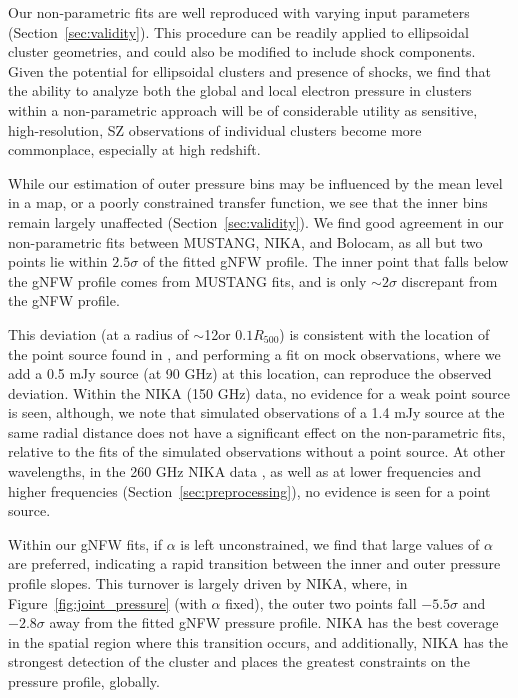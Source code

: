 \documentclass[twocolumn,traditabstract]{aa}
\begin{document}
Our non-parametric fits are well reproduced with varying input parameters (Section~\ref{sec:validity}).
This procedure can be readily applied to ellipsoidal cluster geometries, and could also be modified
to include shock components. Given the potential for ellipsoidal clusters and presence of shocks,
we find that the ability to analyze both the global and local electron pressure in clusters within a
non-parametric approach will be of considerable utility as sensitive, high-resolution,
SZ observations of individual clusters become more commonplace, especially at high redshift.


While our estimation of outer pressure bins may be influenced by the mean level in a map, or a poorly constrained
transfer function, we see that the inner bins remain largely unaffected (Section~\ref{sec:validity}).
We find good agreement in our non-parametric fits between MUSTANG, NIKA, and Bolocam, as all but two points
lie within $2.5\sigma$ of the fitted gNFW profile. The inner point that falls below the gNFW profile comes from
MUSTANG fits, and is only $\sim 2\sigma$ discrepant from the gNFW profile.

This deviation (at a radius of $\sim$12\asec or $0.1 R_{500}$) is consistent with the location of the point source found in
\citet{korngut2011}, and performing a fit on mock observations, where we add a 0.5 mJy source (at 90 GHz)
at this location,
can reproduce the observed deviation. Within the NIKA (150 GHz) data, no evidence for a weak point source is seen,
although, we note that simulated observations of a 1.4 mJy source at the same radial distance does not have a
significant effect on the non-parametric fits, relative to the fits of the simulated observations without a point source.
At other wavelengths, in the 260 GHz NIKA data \citep{adam2015}, as well as at lower frequencies and higher frequencies
(Section~\ref{sec:preprocessing}), no evidence is seen for a point source.


Within our gNFW fits, if $\alpha$ is left unconstrained, we find that large values of $\alpha$ are preferred, indicating a
rapid transition between the inner and outer pressure profile slopes. This turnover is largely driven by NIKA, where, in
Figure~\ref{fig:joint_pressure} (with $\alpha$ fixed), the outer two points fall $-5.5\sigma$ and $-2.8\sigma$ away from
the fitted gNFW pressure profile. NIKA has the best coverage in the spatial region where this transition occurs, and additionally,
NIKA has the strongest detection of the cluster and places the greatest constraints on the pressure profile, globally.
\end{document}
